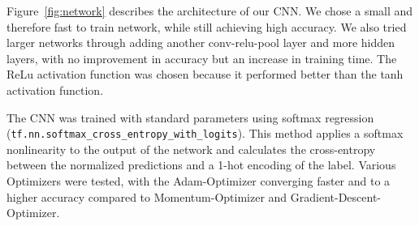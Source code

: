\documentclass{article}
\def\code#1{\texttt{#1}}
\begin{document}
\begin{enumerate}
	\begin{item}
		Figure~\ref{fig:network} describes the architecture of our CNN. We chose a small and therefore fast to train network, while still achieving high accuracy. We also tried larger networks through adding another conv-relu-pool layer and more hidden layers, with no improvement in accuracy but an increase in training time. The ReLu activation function was chosen because it performed better than the tanh activation function.
	\end{item}
	\begin{item}
		The CNN was trained with standard parameters using softmax regression (\code{tf.nn.softmax\_cross\_entropy\_with\_logits}). This method applies a softmax nonlinearity to the output of the network and calculates the cross-entropy between the normalized predictions and a 1-hot encoding of the label. Various Optimizers were tested, with the Adam-Optimizer converging faster and to a higher accuracy compared to Momentum-Optimizer and Gradient-Descent-Optimizer.
	\end{item}


\end{enumerate}
\end{document}
